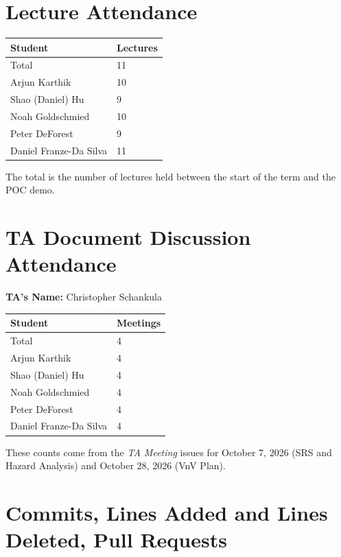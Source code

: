 \documentclass{article}
\begin{document}
\section{Lecture Attendance}

\begin{table}[H]
\centering
\begin{tabular}{ll}
\toprule
\textbf{Student} & \textbf{Lectures}\\
\midrule
Total & 11\\
Arjun Karthik & 10\\
Shao (Daniel) Hu & 9\\
Noah Goldschmied & 10\\
Peter DeForest & 9\\
Daniel Franze-Da Silva & 11\\
\bottomrule
\end{tabular}
\end{table}

The total is the number of lectures held between the start of the term and
the POC demo.

\section{TA Document Discussion Attendance} \label{SecTA}

\noindent \textbf{TA's Name: } Christopher Schankula

\begin{table}[H]
\centering
\begin{tabular}{ll}
\toprule
\textbf{Student} & \textbf{Meetings}\\
\midrule
Total & 4\\
Arjun Karthik & 4\\
Shao (Daniel) Hu & 4\\
Noah Goldschmied & 4\\
Peter DeForest & 4\\
Daniel Franze-Da Silva & 4\\
\bottomrule
\end{tabular}
\end{table}

These counts come from the \textit{TA Meeting} issues for October 7, 2026 (SRS
and Hazard Analysis) and October 28, 2026 (VnV Plan).

\section{Commits, Lines Added and Lines Deleted, Pull Requests}
\end{document}
